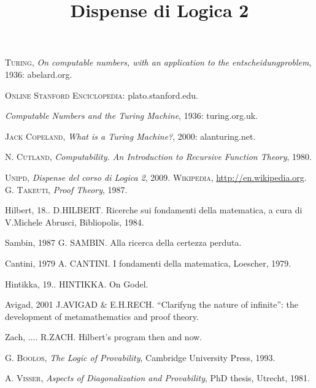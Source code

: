 \documentclass[10pt,a4paper]{amsbook}
\title{Dispense di Logica 2}
\author{}
\date{}
\begin{document}
\maketitle

\tableofcontents











\begin{thebibliography} {}
 \textsc{Turing}, \textsl{On computable numbers, with an
application to the entscheidungproblem}, 1936: abelard.org.

 \textsc{Online Stanford Enciclopedia}: plato.stanford.edu.

 \textsl{Computable Numbers and the Turing Machine}, 1936:
turing.org.uk.

 \textsc{Jack Copeland}, \textsl{What is a Turing Machine?}, 2000:
alanturing.net.

 \textsc{N. Cutland}, \textsl{Computability. An
  Introduction to Recursive Function Theory}, 1980.

 \textsc{Unipd}, \textsl{Dispense del corso di Logica 2},
  2009.
 \textsc{Wikipedia}, \url{http://en.wikipedia.org}.
 \textsc{G. Takeuti}, \textsl{Proof Theory}, 1987.

\bibitem{key-1}{[}Hilbert, 18.. D.HILBERT. Ricerche sui fondamenti
della matematica, a cura di V.Michele Abrusci, Bibliopolis, 1984.

\bibitem{key-4}{[}Sambin, 1987 G. SAMBIN. Alla ricerca della certezza
perduta. 

\bibitem{key-5}{[}Cantini, 1979 A. CANTINI. I fondamenti della matematica,
Loescher, 1979.

\bibitem{key-8}{[}Hintikka, 19.. HINTIKKA. On Godel.

\bibitem{key-1}{[}Avigad, 2001 J.AVIGAD \& E.H.RECH. {}``Clarifyng
the nature of infinite'': the development of metamathematics and
proof theory.

\bibitem{key-1}{[}Zach, .... R.ZACH. Hilbert's program then and now.

 \textsc{G. Boolos}, \textsl{The Logic of Provability}, Cambridge University Press, 1993.

 \textsc{A. Visser}, \textsl{Aspects of Diagonalization and Provability}, PhD thesis, Utrecht, 1981.

\end{thebibliography}
\end{document}
